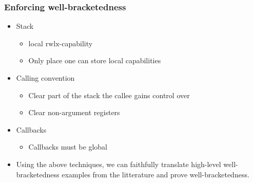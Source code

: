 \documentclass[handout]{beamer}
\newcommand{\plainperm}[1]{\mathrm{#1}}
\newcommand{\rwlx}{\plainperm{rwlx}}
\begin{document}
\begin{frame}
  \frametitle{Enforcing well-bracketedness}
  \begin{itemize}
  \item Stack
    \begin{itemize}
    \item local $\rwlx$-capability
    \item Only place one can store local capabilities
    \end{itemize}
  \item Calling convention
    \begin{itemize}
    \item Clear part of the stack the callee gains control over
    \item Clear non-argument registers 
    \end{itemize}
  \item Callbacks
    \begin{itemize}
    \item Callbacks must be global
    \end{itemize}
  \end{itemize}
  \begin{itemize}
  \item Using the above techniques, we can faithfully translate high-level well-bracketedness examples from the litterature and prove well-bracketedness.
  \end{itemize}
\end{frame}
\end{document}
